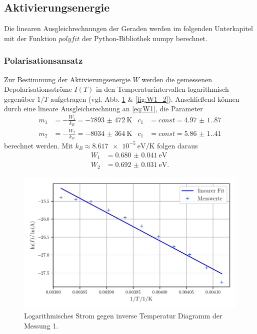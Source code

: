 \subsection{Aktivierungsenergie}
Die linearen Ausgleichrechnungen der Geraden werden im folgenden Unterkapitel mit der Funktion $polyfit$ der Python-Bibliothek numpy\cite{numpy} berechnet.
\subsubsection{Polarisationsansatz}
Zur Bestimmung der Aktivierungsenergie $W$ werden die gemessenen Depolarisationsströme $I(T)$ in den Temperaturintervallen
logarithmisch gegenüber $1/T$ aufgetragen (vgl. Abb. \ref{fig:W1_1} \& \ref{fig:W1_2}). Anschließend können durch eine lineare Ausgleichsrechnung an \autoref{eq:W1}, die Parameter
\begin{align}
    m_1 &= - \frac{W_1}{k_B} = \qty{-7893(472)}{\kelvin} & c_1 &= const = \num{4.97(1.87)} \\
    m_2 &= - \frac{W_2}{k_B} = \qty{-8034(364)}{\kelvin} & c_1 &= const = \num{5.86(1.41)}
\end{align}
berechnet werden. Mit $k_B \approx \qty{8,617e-5}{\electronvolt\per\kelvin}$ folgen daraus
\begin{align}
    W_1 &= \qty{0.680(41)}{\electronvolt} \\
    W_2 &= \qty{0.692(31)}{\electronvolt}.
\end{align}
\begin{figure}
    \centering
    \includegraphics[width=0.8\linewidth]{scripts/build/plot1_1.pdf}
    \caption{Logarithmisches Strom gegen inverse Temperatur Diagramm der Messung 1.}
    \label{fig:W1_1}
\end{figure}
